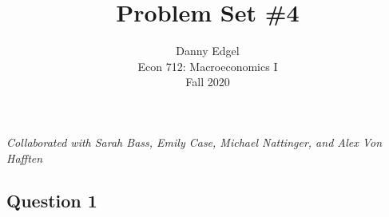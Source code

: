 \documentclass{article}
\begin{document}
\title{	Problem Set \#4 }
\author{ 	Danny Edgel 					\\ 
			Econ 712: Macroeconomics I		\\
			Fall 2020						\\
		}
\maketitle\thispagestyle{empty}


\noindent\textit{Collaborated with Sarah Bass, Emily Case, Michael Nattinger, and Alex Von Hafften}

\subsection*{Question 1}
\end{document}
